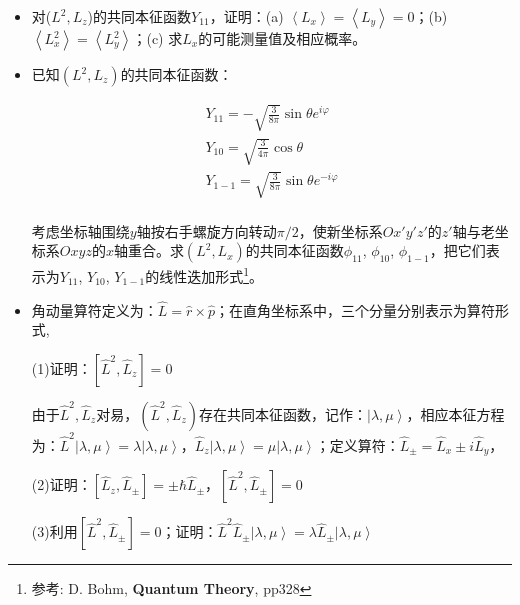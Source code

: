 \begin{itemize}

\item 

对($L^2, L_z$)的共同本征函数$Y_{11}$，证明：(a) $\left\langle L_x \right\rangle = \left\langle L_y \right\rangle = 0$；(b) $\left\langle L_x^2 \right\rangle = \left\langle L_y^2 \right\rangle$；(c) 求$L_x$的可能测量值及相应概率。

\item 已知$\left( {L^2 ,L_z } \right)$的共同本征函数：

\begin{equation*}
 \begin{array}{l}
 Y_{11}  =  - \sqrt {\frac{3}{{8\pi }}} \sin \theta e^{i\varphi }  \\
 Y_{10}  = \sqrt {\frac{3}{{4\pi }}} \cos \theta  \\
 Y_{1 - 1}  = \sqrt {\frac{3}{{8\pi }}} \sin \theta e^{ - i\varphi }  \\
 \end{array}
\end{equation*}


考虑坐标轴围绕$y$轴按右手螺旋方向转动$\pi/2$，使新坐标系$Ox'y'z'$的$z'$轴与老坐标系$Oxyz$的$x$轴重合。求$\left(
{L^2 ,L_x } \right)$的共同本征函数$\phi_{11}$, $\phi_{10}$,
$\phi_{1-1}$，把它们表示为$Y_{11}$, $Y_{10}$,
$Y_{1-1}$的线性迭加形式\footnote{参考: D. Bohm, \textbf{Quantum
Theory}, pp328}。

\item 角动量算符定义为：$\widehat L = \widehat r \times \widehat p$；在直角坐标系中，三个分量分别表示为算符形式,

(1)证明：$\left[ {\widehat L^2 ,\widehat L_z } \right] = 0$

由于$\widehat L^2 ,\widehat L_z $对易，$\left( {\widehat L^2 ,\widehat L_z } \right)$存在共同本征函数，记作：$\left| {\lambda ,\mu } \right\rangle $，相应本征方程为：$\widehat L^2 \left| {\lambda ,\mu } \right\rangle  = \lambda \left| {\lambda ,\mu } \right\rangle $，$\widehat L_z \left| {\lambda ,\mu } \right\rangle  = \mu \left| {\lambda ,\mu } \right\rangle $；定义算符：$\widehat L_ \pm   = \widehat L_x  \pm i\widehat L_y $，

(2)证明：$\left[ {\widehat L_z ,\widehat L_ \pm  } \right] =  \pm \hbar \widehat L_ \pm  $，$\left[ {\widehat L^2 ,\widehat L_ \pm  } \right] = 0$

(3)利用$\left[ {\widehat L^2 ,\widehat L_ \pm  } \right] = 0$；证明：$\widehat L^2 \widehat L_ \pm  \left| {\lambda ,\mu } \right\rangle  = \lambda \widehat L_ \pm  \left| {\lambda ,\mu } \right\rangle $



\end{itemize}
